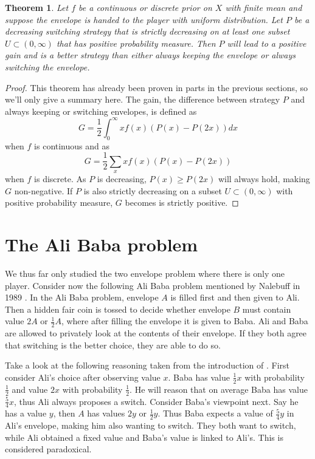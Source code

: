 \documentclass[a4paper]{report}
\theoremstyle{plain}
\newtheorem{theorem}{Theorem}[section]
\theoremstyle{definition}
\theoremstyle{remark}
\numberwithin{equation}{chapter}
\DeclareMathOperator{\1}{\mathbbm{1}}
\begin{document}
\begin{theorem}\label{thm:switchall}
Let $f$ be a continuous or discrete prior on $X$ with finite mean and suppose the envelope is handed to the player with uniform distribution. Let $P$ be a decreasing switching strategy that is strictly decreasing on at least one subset $U\subset(0,\infty)$ that has positive probability measure. Then $P$ will lead to a positive gain and is a better strategy than either always keeping the envelope or always switching the envelope.
\end{theorem}
\begin{proof}
This theorem has already been proven in parts in the previous sections, so we'll only give a summary here. The gain, the difference between strategy $P$ and always keeping or switching envelopes, is defined as
\begin{equation}
G=\frac{1}{2}\int_0^\infty xf(x)(P(x)-P(2x))dx
\end{equation}
when $f$ is continuous and as
\begin{equation}
G=\frac{1}{2}\sum_xxf(x)(P(x)-P(2x))
\end{equation}
when $f$ is discrete. As $P$ is decreasing, $P(x)\geq P(2x)$ will always hold, making $G$ non-negative. If $P$ is also strictly decreasing on a subset $U\subset(0,\infty)$ with positive probability measure, $G$ becomes is strictly positive.
\end{proof}

\section{The Ali Baba problem}\label{sec:EnvelopeAli}
We thus far only studied the two envelope problem where there is only one player. Consider now the following Ali Baba problem mentioned by Nalebuff in 1989 \cite{Nalebuff89}. In the Ali Baba problem, envelope $A$ is filled first and then given to Ali. Then a hidden fair coin is tossed to decide whether envelope $B$ must contain value $2A$ or $\frac{1}{2}A$, where after filling the envelope it is given to Baba. Ali and Baba are allowed to privately look at the contents of their envelope. If they both agree that switching is the better choice, they are able to do so.

Take a look at the following reasoning taken from the introduction of \cite{Nalebuff89}. First consider Ali's choice after observing value $x$. Baba has value $\frac{1}{2}x$ with probability $\frac{1}{2}$ and value $2x$ with probability $\frac{1}{2}$. He will reason that on average Baba has value $\frac{5}{4}x$, thus Ali always proposes a switch. Consider Baba's viewpoint next. Say he has a value $y$, then $A$ has values $2y$ or $\frac{1}{2}y$. Thus Baba expects a value of $\frac{5}{4}y$ in Ali's envelope, making him also wanting to switch. They both want to switch, while Ali obtained a fixed value and Baba's value is linked to Ali's. This is considered paradoxical.
\end{document}
